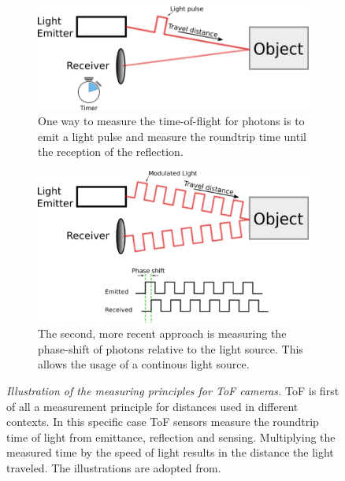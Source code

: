 \begin{figure}[H]
    \centering
    \begin{subfigure}[t]{0.45\textwidth}
        \includegraphics[width=\textwidth]{chapter03/img/tof_traveltime_original.png}
        \caption{One way to measure the time-of-flight for photons is to emit a light pulse and measure the roundtrip time until the reception of the reflection.}\label{fig:tof_roundtrip}
    \end{subfigure}\quad
    \begin{subfigure}[t]{0.45\textwidth}
        \includegraphics[width=\textwidth]{chapter03/img/tof_phase_shift_original.png}
        \caption{The second, more recent approach is measuring the phase-shift of photons relative to the light source. This allows the usage of a continous light source.}\label{fig:tof_phase_shift}
    \end{subfigure}
    \caption[Illustration of the measuring principles for \acrshort{ToF} cameras]{\emph{Illustration of the measuring principles for \acrshort{ToF} cameras.} \acrlong{ToF} is first of all a measurement principle for distances used in different contexts. In this specific case \acrshort{ToF} sensors measure the roundtrip time of light from emittance, reflection and sensing. Multiplying the measured time by the speed of light results in the distance the light traveled. The illustrations are adopted from\cite{tof_cameras}.}\label{fig:tof_illustration}
\end{figure}
